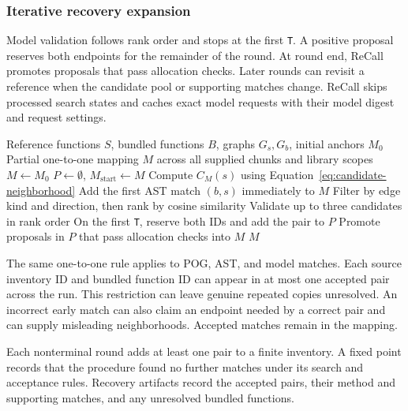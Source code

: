 \subsubsection{Iterative recovery expansion}
Model validation follows rank order and stops at the first \texttt{T}. A positive proposal reserves both endpoints for the remainder of the round. At round end, ReCall promotes proposals that pass allocation checks. Later rounds can revisit a reference when the candidate pool or supporting matches change. ReCall skips processed search states and caches exact model requests with their model digest and request settings.

\begin{algorithm}[htbp]
\caption{Default source-first one-to-one recovery}
\label{alg:recovery}
\begin{algorithmic}[1]
\Require Reference functions $S$, bundled functions $B$, graphs $G_s,G_b$, initial anchors $M_0$
\Ensure Partial one-to-one mapping $M$ across all supplied chunks and library scopes
\State $M\gets M_0$
\Repeat
  \State $P\gets\emptyset$, $M_{\mathrm{start}}\gets M$
    \State Compute $C_M(s)$ using Equation~\ref{eq:candidate-neighborhood}
        \State Add the first AST match $(b,s)$ immediately to $M$
      \Else
        \State Filter by edge kind and direction, then rank by cosine similarity
        \State Validate up to three candidates in rank order
        \State On the first \texttt{T}, reserve both IDs and add the pair to $P$
      \EndIf
    \EndIf
  \EndFor
  \State Promote proposals in $P$ that pass allocation checks into $M$
\State \Return $M$
\end{algorithmic}
\end{algorithm}

The same one-to-one rule applies to POG, AST, and model matches. Each source inventory ID and bundled function ID can appear in at most one accepted pair across the run. This restriction can leave genuine repeated copies unresolved. An incorrect early match can also claim an endpoint needed by a correct pair and can supply misleading neighborhoods. Accepted matches remain in the mapping.

Each nonterminal round adds at least one pair to a finite inventory. A fixed point records that the procedure found no further matches under its search and acceptance rules. Recovery artifacts record the accepted pairs, their method and supporting matches, and any unresolved bundled functions.
